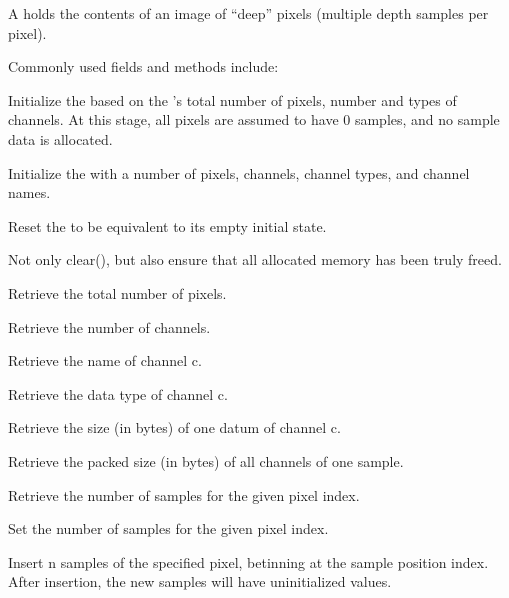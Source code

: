 A \DeepData holds the contents of an image of ``deep'' pixels (multiple
depth samples per pixel).

\noindent Commonly used \DeepData fields and methods include:

Initialize the \DeepData based on the \ImageSpec's total number of pixels,
number and types of channels. At this stage, all pixels are assumed to
have 0 samples, and no sample data is allocated.
\apiend

Initialize the \DeepData with a number of pixels, channels, channel
types, and channel names.
\apiend

Reset the \DeepData to be equivalent to its empty initial state.
\apiend

Not only {\cf clear()}, but also ensure that all allocated memory has been
truly freed.
\apiend

Retrieve the total number of pixels.
\apiend

Retrieve the number of channels.
\apiend

Retrieve the name of channel {\cf c}.
\apiend

Retrieve the data type of channel {\cf c}.
\apiend

Retrieve the size (in bytes) of one datum of channel {\cf c}.
\apiend

Retrieve the packed size (in bytes) of all channels of one sample.
\apiend

Retrieve the number of samples for the given pixel index.
\apiend

Set the number of samples for the given pixel index.
\apiend

Insert {\cf n} samples of the specified pixel, betinning at the sample
position index. After insertion, the new samples will have uninitialized
values.
\apiend

